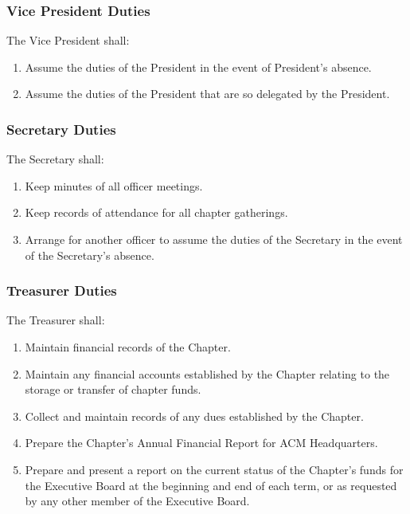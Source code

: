 \documentclass{article}
\begin{document}
\subsubsection{Vice President Duties}

The Vice President shall:

\begin{enumerate}
\item
  Assume the duties of the President in the event of President's
  absence.
\item
  Assume the duties of the President that are so delegated by the
  President.
\end{enumerate}

\subsubsection{Secretary Duties}

The Secretary shall:

\begin{enumerate}
\item
  Keep minutes of all officer meetings.
\item
  Keep records of attendance for all chapter gatherings.
\item
  Arrange for another officer to assume the duties of the Secretary in
  the event of the Secretary's absence.
\end{enumerate}


\subsubsection{Treasurer Duties}

The Treasurer shall:

\begin{enumerate}
\item
  Maintain financial records of the Chapter.
\item
  Maintain any financial accounts established by the Chapter relating to
  the storage or transfer of chapter funds.
\item
  Collect and maintain records of any dues established by the Chapter.
\item
  Prepare the Chapter's Annual Financial Report for ACM Headquarters.
\item
  Prepare and present a report on the current status of the Chapter's
  funds for the Executive Board at the beginning and end of each term,
  or as requested by any other member of the Executive Board.
\end{enumerate}
\end{document}
